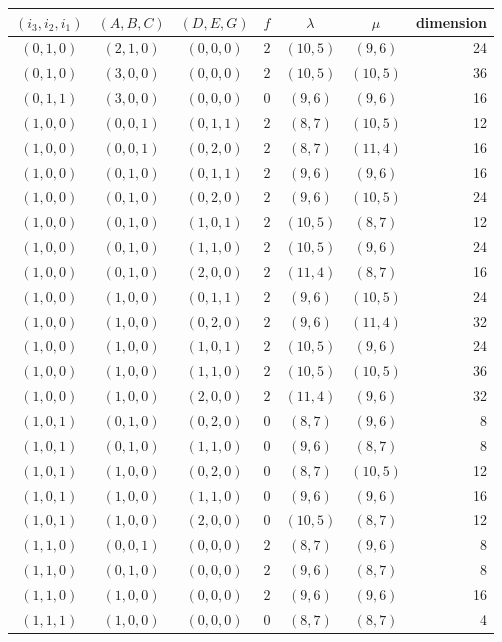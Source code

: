 \begin{center}\small
\begin{tabular}{ccccccr}
\toprule
$(i_3,i_2,i_1)$ & $(A,B,C)$ & $(D,E,G)$ & $f$ & $\lambda$ & $\mu$ & dimension\\
\midrule
$(0,1,0)$ & $(2,1,0)$ & $(0,0,0)$ & $2$ & $(10,5)$ & $(9,6)$ & 24\\
$(0,1,0)$ & $(3,0,0)$ & $(0,0,0)$ & $2$ & $(10,5)$ & $(10,5)$ & 36\\
$(0,1,1)$ & $(3,0,0)$ & $(0,0,0)$ & $0$ & $(9,6)$ & $(9,6)$ & 16\\
$(1,0,0)$ & $(0,0,1)$ & $(0,1,1)$ & $2$ & $(8,7)$ & $(10,5)$ & 12\\
$(1,0,0)$ & $(0,0,1)$ & $(0,2,0)$ & $2$ & $(8,7)$ & $(11,4)$ & 16\\
$(1,0,0)$ & $(0,1,0)$ & $(0,1,1)$ & $2$ & $(9,6)$ & $(9,6)$ & 16\\
$(1,0,0)$ & $(0,1,0)$ & $(0,2,0)$ & $2$ & $(9,6)$ & $(10,5)$ & 24\\
$(1,0,0)$ & $(0,1,0)$ & $(1,0,1)$ & $2$ & $(10,5)$ & $(8,7)$ & 12\\
$(1,0,0)$ & $(0,1,0)$ & $(1,1,0)$ & $2$ & $(10,5)$ & $(9,6)$ & 24\\
$(1,0,0)$ & $(0,1,0)$ & $(2,0,0)$ & $2$ & $(11,4)$ & $(8,7)$ & 16\\
$(1,0,0)$ & $(1,0,0)$ & $(0,1,1)$ & $2$ & $(9,6)$ & $(10,5)$ & 24\\
$(1,0,0)$ & $(1,0,0)$ & $(0,2,0)$ & $2$ & $(9,6)$ & $(11,4)$ & 32\\
$(1,0,0)$ & $(1,0,0)$ & $(1,0,1)$ & $2$ & $(10,5)$ & $(9,6)$ & 24\\
$(1,0,0)$ & $(1,0,0)$ & $(1,1,0)$ & $2$ & $(10,5)$ & $(10,5)$ & 36\\
$(1,0,0)$ & $(1,0,0)$ & $(2,0,0)$ & $2$ & $(11,4)$ & $(9,6)$ & 32\\
$(1,0,1)$ & $(0,1,0)$ & $(0,2,0)$ & $0$ & $(8,7)$ & $(9,6)$ & 8\\
$(1,0,1)$ & $(0,1,0)$ & $(1,1,0)$ & $0$ & $(9,6)$ & $(8,7)$ & 8\\
$(1,0,1)$ & $(1,0,0)$ & $(0,2,0)$ & $0$ & $(8,7)$ & $(10,5)$ & 12\\
$(1,0,1)$ & $(1,0,0)$ & $(1,1,0)$ & $0$ & $(9,6)$ & $(9,6)$ & 16\\
$(1,0,1)$ & $(1,0,0)$ & $(2,0,0)$ & $0$ & $(10,5)$ & $(8,7)$ & 12\\
$(1,1,0)$ & $(0,0,1)$ & $(0,0,0)$ & $2$ & $(8,7)$ & $(9,6)$ & 8\\
$(1,1,0)$ & $(0,1,0)$ & $(0,0,0)$ & $2$ & $(9,6)$ & $(8,7)$ & 8\\
$(1,1,0)$ & $(1,0,0)$ & $(0,0,0)$ & $2$ & $(9,6)$ & $(9,6)$ & 16\\
$(1,1,1)$ & $(1,0,0)$ & $(0,0,0)$ & $0$ & $(8,7)$ & $(8,7)$ & 4\\
\bottomrule
\end{tabular}
\end{center}

